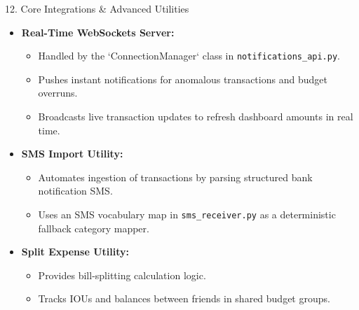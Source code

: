 \documentclass[10pt,aspectratio=169]{beamer}
\begin{document}
\begin{frame}{12. Core Integrations \& Advanced Utilities}
    \begin{itemize}
        \item \textbf{Real-Time WebSockets Server:}
            \begin{itemize}
                \item Handled by the `ConnectionManager` class in \texttt{notifications\_api.py}.
                \item Pushes instant notifications for anomalous transactions and budget overruns.
                \item Broadcasts live transaction updates to refresh dashboard amounts in real time.
            \end{itemize}
        \item \textbf{SMS Import Utility:}
            \begin{itemize}
                \item Automates ingestion of transactions by parsing structured bank notification SMS.
                \item Uses an SMS vocabulary map in \texttt{sms\_receiver.py} as a deterministic fallback category mapper.
            \end{itemize}
        \item \textbf{Split Expense Utility:}
            \begin{itemize}
                \item Provides bill-splitting calculation logic.
                \item Tracks IOUs and balances between friends in shared budget groups.
            \end{itemize}
    \end{itemize}
\end{frame}
\end{document}
